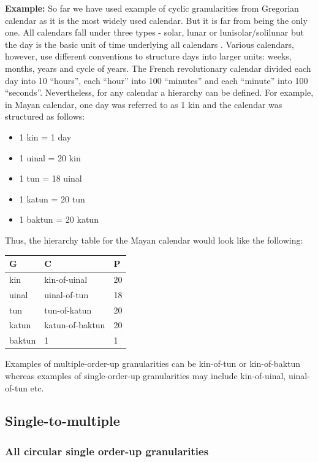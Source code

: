 \documentclass[12pt]{article}
\providecommand{\tightlist}{%
  \setlength{\itemsep}{0pt}\setlength{\parskip}{0pt}}
\begin{document}
\textbf{Example:} So far we have used example of cyclic granularities from Gregorian calendar as it is the most widely used calendar. But it is far from being the only one. All calendars fall under three types - solar, lunar or lunisolar/solilunar but the day is the basic unit of time underlying all calendars \citep{Reingold2001-kf}. Various calendars, however, use different conventions to structure days into larger units: weeks, months, years and cycle of years. The French revolutionary calendar divided each day into 10 ``hours'', each ``hour'' into 100 ``minutes'' and each ``minute'' into 100 ``seconds''. Nevertheless, for any calendar a hierarchy can be defined. For example, in Mayan calendar, one day was referred to as 1 kin and the calendar was structured as follows:

\begin{itemize}
\tightlist
\item
  1 kin = 1 day
\item
  1 uinal = 20 kin
\item
  1 tun = 18 uinal
\item
  1 katun = 20 tun
\item
  1 baktun = 20 katun
\end{itemize}

Thus, the hierarchy table for the Mayan calendar would look like the following:

\begin{longtable}[]{@{}lll@{}}
\toprule
G & C & P\tabularnewline
\midrule
\endhead
kin & kin-of-uinal & 20\tabularnewline
uinal & uinal-of-tun & 18\tabularnewline
tun & tun-of-katun & 20\tabularnewline
katun & katun-of-baktun & 20\tabularnewline
baktun & 1 & 1\tabularnewline
\bottomrule
\end{longtable}

Examples of multiple-order-up granularities can be kin-of-tun or kin-of-baktun whereas examples of single-order-up granularities may include kin-of-uinal, uinal-of-tun etc.

\hypertarget{sec:single-to-multiple}{%
\subsection{Single-to-multiple}\label{sec:single-to-multiple}}

\hypertarget{sec:all-circular}{%
\subsubsection{All circular single order-up granularities}\label{sec:all-circular}}
\end{document}
